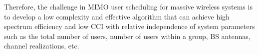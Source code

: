 Therefore, the challenge in MIMO user scheduling for massive wireless systems is to develop a low complexity and effective
algorithm that can achieve high spectrum efficiency and low CCI with relative independence of system parameters such as the total number of users, number of users within a group, BS antennas, channel realizations, etc.


